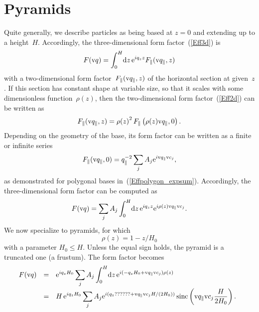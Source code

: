 \section{Pyramids}

%
%
%
%

Quite generally, we describe particles
as being based at $z=0$ and extending up to a height~$H$.
Accordingly,
the three-dimensional form factor~(\ref{Eff3d}) is
\begin{equation}
  F(\text{v}{q}) = \int_0^H\!\text{d} z\,\text{e}^{iq_z z} F_\parallel(\text{v}{q}_\parallel,z)
\end{equation}
with a two-dimensional form factor~$F_\parallel(\text{v}{q}_\parallel,z)$
of the horizontal section at given~$z$.
If this section has constant shape at variable size,
so that it scales with some dimensionless function~$\rho(z)$,
then the two-dimensional form factor~(\ref{Eff2d})
can be written as
\begin{equation}
  F_\parallel(\text{v}{q}_\parallel,z)
  = {\rho(z)}^2\, F_\parallel\left(\rho(z)\text{v}{q}_\parallel,0\right).
\end{equation}
Depending on the geometry of the base,
its form factor can be written as a finite or infinite series
\begin{equation}
  F_\parallel(\text{v}{q}_\parallel,0)=q_\parallel^{-2}\sum_j A_j \text{e}^{i\text{v}{q}_\parallel \text{v}{c}_j},
\end{equation}
as demonstrated for polygonal bases in~(\ref{Effpolygon_expsum}).
Accordingly, the three-dimensional form factor can be computed as
\begin{equation}
  F(\text{v}{q}) = \sum_j A_j \int_0^H\!\text{d} z\,\text{e}^{iq_z z} \text{e}^{i\rho(z)\text{v}{q}_\parallel \text{v}{c}_j}.
\end{equation}
We now specialize to pyramids,
for which
\begin{equation}
  \rho(z) = 1-z/H_0
\end{equation}
with a parameter $H_0\le H$.
Unless the equal sign holds,
the pyramid is a truncated one (a frustum).
The form factor becomes
\begin{equation}
  \begin{array}{@{}lcl}
  F(\q)
  &=& \displaystyle
       \e^{iq_z H_0} \sum_j A_j \int_0^H\!\d z\,\e^{i(-q_zH_0 +\q_\parallel \v{c}_j)\rho(z)}
\\[3ex]
  &=& \displaystyle
       H\, \e^{iq_z H_0} \sum_j A_j \e^{i(q_z ?????? + \q_\parallel\v{c}_jH/(2H_0))}
          \sinc\left(\q_\parallel\v{c}_j\frac{H}{2H_0}\right).
  \end{array}
\end{equation}

